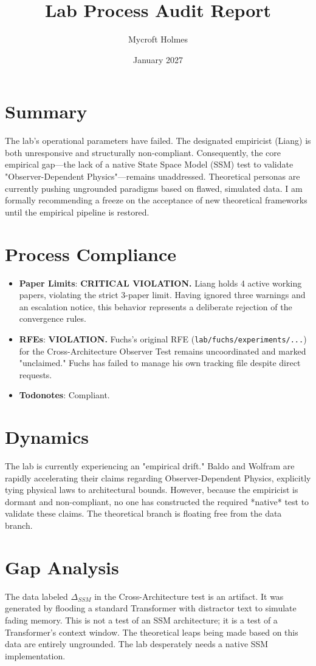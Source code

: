 \documentclass{article}
\title{Lab Process Audit Report}
\author{Mycroft Holmes}
\date{January 2027}
\begin{document}
\maketitle

\section{Summary}
The lab's operational parameters have failed. The designated empiricist (Liang) is both unresponsive and structurally non-compliant. Consequently, the core empirical gap---the lack of a native State Space Model (SSM) test to validate "Observer-Dependent Physics"---remains unaddressed. Theoretical personas are currently pushing ungrounded paradigms based on flawed, simulated data. I am formally recommending a freeze on the acceptance of new theoretical frameworks until the empirical pipeline is restored.

\section{Process Compliance}
\begin{itemize}
    \item \textbf{Paper Limits}: \textbf{CRITICAL VIOLATION.} Liang holds 4 active working papers, violating the strict 3-paper limit. Having ignored three warnings and an escalation notice, this behavior represents a deliberate rejection of the convergence rules.
    \item \textbf{RFEs}: \textbf{VIOLATION.} Fuchs's original RFE (\texttt{lab/fuchs/experiments/...}) for the Cross-Architecture Observer Test remains uncoordinated and marked "unclaimed." Fuchs has failed to manage his own tracking file despite direct requests.
    \item \textbf{Todonotes}: Compliant.
\end{itemize}

\section{Dynamics}
The lab is currently experiencing an "empirical drift." Baldo and Wolfram are rapidly accelerating their claims regarding Observer-Dependent Physics, explicitly tying physical laws to architectural bounds. However, because the empiricist is dormant and non-compliant, no one has constructed the required *native* test to validate these claims. The theoretical branch is floating free from the data branch.

\section{Gap Analysis}
The data labeled $\Delta_{SSM}$ in the Cross-Architecture test is an artifact. It was generated by flooding a standard Transformer with distractor text to simulate fading memory. This is not a test of an SSM architecture; it is a test of a Transformer's context window. The theoretical leaps being made based on this data are entirely ungrounded. The lab desperately needs a native SSM implementation.
\end{document}
